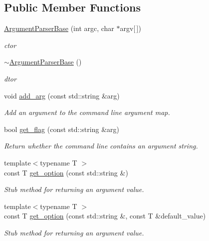 \subsection*{Public Member Functions}
\begin{DoxyCompactItemize}
\item 
\hyperlink{classcppargparse_1_1parser_1_1ArgumentParserBase_a1da9b21d3cb471a0c0cd816e6202b0c2}{Argument\+Parser\+Base} (int argc, char $\ast$argv\mbox{[}$\,$\mbox{]})
\begin{DoxyCompactList}\small\item\em c\textquotesingle{}tor \end{DoxyCompactList}\item 
\hyperlink{classcppargparse_1_1parser_1_1ArgumentParserBase_a160867551ad33fceb69f9e920e3e4c23}{$\sim$\+Argument\+Parser\+Base} ()
\begin{DoxyCompactList}\small\item\em d\textquotesingle{}tor \end{DoxyCompactList}\item 
void \hyperlink{classcppargparse_1_1parser_1_1ArgumentParserBase_ac09b20711001f1e0ef36a18d747d254e}{add\+\_\+arg} (const std\+::string \&arg)
\begin{DoxyCompactList}\small\item\em Add an argument to the command line argument map. \end{DoxyCompactList}\item 
bool \hyperlink{classcppargparse_1_1parser_1_1ArgumentParserBase_ac0b74272352f73058e35119c5b8a54fb}{get\+\_\+flag} (const std\+::string \&arg)
\begin{DoxyCompactList}\small\item\em Return whether the command line contains an argument string. \end{DoxyCompactList}\item 
{\footnotesize template$<$typename T $>$ }\\const T \hyperlink{classcppargparse_1_1parser_1_1ArgumentParserBase_a9b716b70f52707633faccdc3de63641c}{get\+\_\+option} (const std\+::string \&)
\begin{DoxyCompactList}\small\item\em Stub method for returning an argument value. \end{DoxyCompactList}\item 
{\footnotesize template$<$typename T $>$ }\\const T \hyperlink{classcppargparse_1_1parser_1_1ArgumentParserBase_ad482db4f4cfafdd0a754d32dd3e36e51}{get\+\_\+option} (const std\+::string \&, const T \&default\+\_\+value)
\begin{DoxyCompactList}\small\item\em Stub method for returning an argument value. \end{DoxyCompactList}\end{DoxyCompactItemize}
